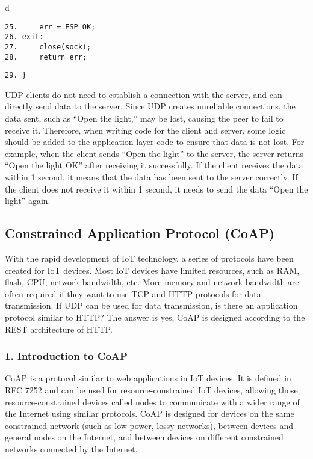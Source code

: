 \documentclass[a4paper,12pt]{book}
\begin{document}
\begin{codebloc}
\begin{tabular}{d}
\vspace{2pt}
\begin{verbatim}
25.     err = ESP_OK;
26. exit:
27.     close(sock);
28.     return err;
\end{verbatim}
\verb|29. }|
\end{tabular}
\end{codebloc}

UDP clients do not need to establish a connection with the server, and can directly send data to the server. Since UDP creates unreliable connections, the data sent, such as “Open the light,” may be lost, causing the peer to fail to receive it. Therefore, when writing code for the client and server, some logic should be added to the application layer code to ensure that data is not lost. For example, when the client sends “Open the light” to the server, the server returns “Open the light OK” after receiving it successfully. If the client receives the data within 1 second, it means that the data has been sent to the server correctly. If the client does not receive it within 1 second, it needs to send the data “Open the light” again.

\subsection{Constrained Application Protocol (CoAP)}
With the rapid development of IoT technology, a series of protocols have been created for IoT devices. Most IoT devices have limited resources, such as RAM, flash, CPU, network bandwidth, etc. More memory and network bandwidth are often required if they want to use TCP and HTTP protocols for data transmission. If UDP can be used for data transmission, is there an application protocol similar to HTTP? The answer is yes, CoAP is designed according to the REST architecture of HTTP.

\subsubsection{1. Introduction to CoAP}
CoAP is a protocol similar to web applications in IoT devices. It is defined in RFC 7252 and can be used for resource-constrained IoT devices, allowing those resource-constrained devices called nodes to communicate with a wider range of the Internet using similar protocols. CoAP is designed for devices on the same constrained network (such as low-power, lossy networks), between devices and general nodes on the Internet, and between devices on different constrained networks connected by the Internet.
\end{document}
